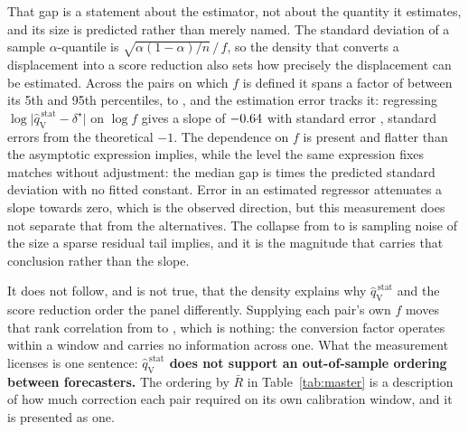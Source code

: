 \documentclass[preprint,11pt,authoryear]{elsarticle}
\newcommand{\1}{\boldsymbol{1}}
\newcommand{\qVstat}{\hat{q}_{\scriptscriptstyle\mathrm{V}}^{\,\mathrm{stat}}}
\begin{document}
That gap is a statement about the estimator, not about the quantity it
estimates, and its size is predicted rather than merely named. The standard
deviation of a sample $\alpha$-quantile is $\sqrt{\alpha(1-\alpha)/n}\,/\,f$, so
the density that converts a displacement into a score reduction also sets how
precisely the displacement can be estimated. Across the \nMCBDensityPairs{} pairs
on which $f$ is defined it spans a factor of \nMCBDensitySpan{} between its 5th
and 95th percentiles, \nMCBDensityLo{} to \nMCBDensityHi, and the estimation
error tracks it: regressing $\log\lvert\qVstat - \delta^\star\rvert$ on $\log f$
gives a slope of $-0.64$ with standard error \nMCBGapSlopeSE,
\nMCBGapSlopeSigma{} standard errors from the theoretical $-1$. The dependence on
$f$ is present and flatter than the asymptotic expression implies, while the
level the same expression fixes matches without adjustment: the median gap is
\nMCBGapMagRatio{} times the predicted standard deviation with no fitted
constant. Error in an estimated regressor attenuates a slope towards zero, which
is the observed direction, but this measurement does not separate that from the
alternatives. The collapse from \nMCBRhoCal{} to \nMCBRhoTest{} is sampling noise
of the size a sparse residual tail implies, and it is the magnitude that carries
that conclusion rather than the slope.

It does not follow, and is not true, that the density explains why $\qVstat$ and
the score reduction order the panel differently. Supplying each pair's own $f$
moves that rank correlation from \nMCBRhoPlain{} to \nMCBRhoConverted, which is
nothing: the conversion factor operates within a window and carries no
information across one. What the measurement licenses is one sentence:
\textbf{$\qVstat$ does not support an out-of-sample ordering between
forecasters.} The ordering by $\bar R$ in Table~\ref{tab:master} is a description
of how much correction each pair required on its own calibration window, and it
is presented as one.
\end{document}
